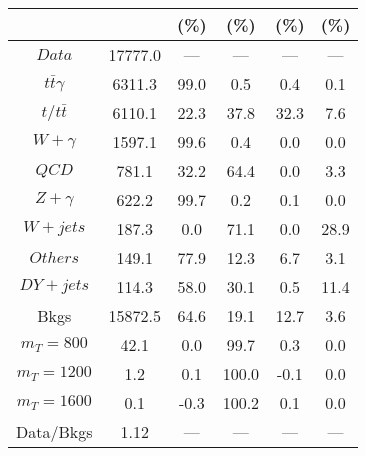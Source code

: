 \begin{figure}
\begin{minipage}[c]{0.32\textwidth}
{\begin{tabular}{cccccc}
 &  & (\%) & (\%) & (\%) & (\%)  \\
\hline
                                                                      $ Data $ &  17777.0 &  --- &  --- &  --- &  ---\\
$ t\bar{t}\gamma $ &  6311.3 &  99.0 &  0.5 &  0.4 &  0.1\\
$ t/t\bar{t} $ &  6110.1 &  22.3 &  37.8 &  32.3 &  7.6\\
$ W+\gamma $ &  1597.1 &  99.6 &  0.4 &  0.0 &  0.0\\
$ QCD $ &  781.1 &  32.2 &  64.4 &  0.0 &  3.3\\
$ Z+\gamma $ &  622.2 &  99.7 &  0.2 &  0.1 &  0.0\\
$ W+jets $ &  187.3 &  0.0 &  71.1 &  0.0 &  28.9\\
$ Others $ &  149.1 &  77.9 &  12.3 &  6.7 &  3.1\\
$ DY+jets $ &  114.3 &  58.0 &  30.1 &  0.5 &  11.4\\
Bkgs &  15872.5 &  64.6 &  19.1 &  12.7 &  3.6\\
$ m_{T} = 800 $ &  42.1 &  0.0 &  99.7 &  0.3 &  0.0\\
$ m_{T} = 1200 $ &  1.2 &  0.1 &  100.0 &  -0.1 &  0.0\\
$ m_{T} = 1600 $ &  0.1 &  -0.3 &  100.2 &  0.1 &  0.0\\
Data/Bkgs &  1.12 &  --- &  --- &  --- &  ---\\
\hline
\end{tabular}
}
\end{minipage}
\end{figure}

